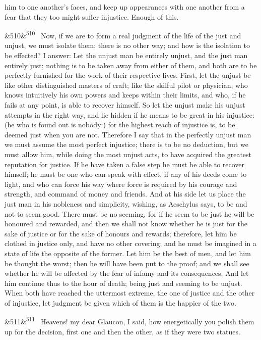 \documentclass[12pt]{article}
\newcommand{\para}[1][]{\par\noindent\ifx&#1&\else\textsuperscript{\footnotesize #1}~\fi}
\begin{document}
him to one another's faces, and keep up appearances with one another from a fear that they too might suffer injustice. Enough of this.

\para[510] Now, if we are to form a real judgment of the life of the just and unjust, we must isolate them; there is no other way; and how is the isolation to be effected? I answer: Let the unjust man be entirely unjust, and the just man entirely just; nothing is to be taken away from either of them, and both are to be perfectly furnished for the work of their respective lives. First, let the unjust be like other distinguished masters of craft; like the skilful pilot or physician, who knows intuitively his own powers and keeps within their limits, and who, if he fails at any point, is able to recover himself. So let the unjust make his unjust attempts in the right way, and lie hidden if he means to be great in his injustice: (he who is found out is nobody:) for the highest reach of injustice is, to be deemed just when you are not. Therefore I say that in the perfectly unjust man we must assume the most perfect injustice; there is to be no deduction, but we must allow him, while doing the most unjust acts, to have acquired the greatest reputation for justice. If he have taken a false step he must be able to recover himself; he must be one who can speak with effect, if any of his deeds come to light, and who can force his way where force is required by his courage and strength, and command of money and friends. And at his side let us place the just man in his nobleness and simplicity, wishing, as Aeschylus says, to be and not to seem good. There must be no seeming, for if he seem to be just he will be honoured and rewarded, and then we shall not know whether he is just for the sake of justice or for the sake of honours and rewards; therefore, let him be clothed in justice only, and have no other covering; and he must be imagined in a state of life the opposite of the former. Let him be the best of men, and let him be thought the worst; then he will have been put to the proof; and we shall see whether he will be affected by the fear of infamy and its consequences. And let him continue thus to the hour of death; being just and seeming to be unjust. When both have reached the uttermost extreme, the one of justice and the other of injustice, let judgment be given which of them is the happier of the two.

\para[511] Heavens! my dear Glaucon, I said, how energetically you polish them up for the decision, first one and then the other, as if they were two statues.
\end{document}
